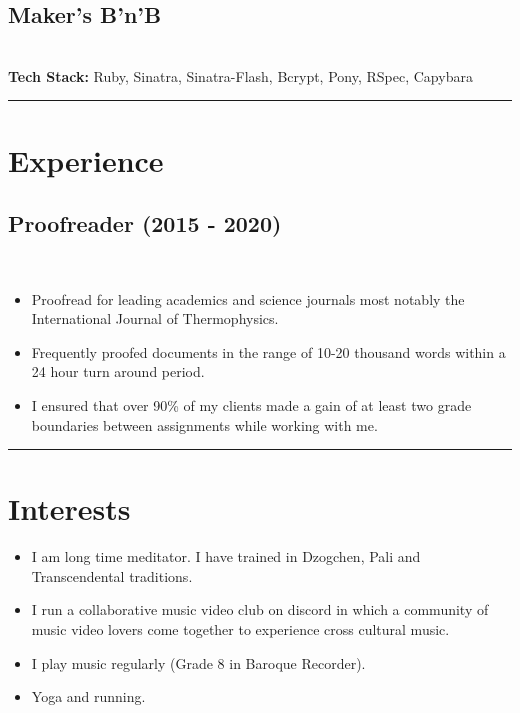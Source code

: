 \documentclass[12pt]{IEEEtran}
\newcommand{\cvrule}{\noindent\rule{8.5cm}{0.4pt}}
\begin{document}
\subsection*{Maker's B'n'B}
 \\
\textbf{Tech Stack:} Ruby, Sinatra, Sinatra-Flash, Bcrypt, Pony, RSpec, Capybara %

\cvrule
\vskip 0.35in

\section*{\textbf{Experience}}

\subsection*{Proofreader (2015 - 2020)}
\\[1pt]
\begin{itemize}
\item Proofread for leading academics and science journals most notably the International Journal of Thermophysics.
\item Frequently proofed documents in the range of 10-20 thousand words within a 24 hour turn around period.
\item I ensured that over 90\% of my clients made a gain of at least two grade boundaries between assignments while working with me.
\end{itemize}

\cvrule
\vskip 0.35in
\section*{I\textbf{nterests}}

\begin{itemize}
\item I am long time meditator. I have trained in Dzogchen, Pali and Transcendental traditions.
\item I run a collaborative music video club on discord in which a community of music video lovers come together to experience cross cultural music.
\item I play music regularly (Grade 8 in Baroque Recorder).
\item Yoga and running.
\end{itemize}
\end{document}
